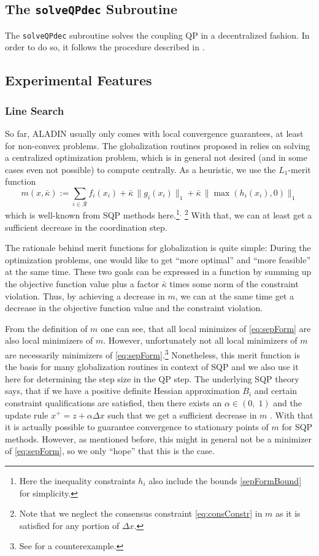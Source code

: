 \documentclass[]{scrartcl}
\begin{document}
\subsection{The \texttt{solveQPdec} Subroutine}
The \texttt{solveQPdec} subroutine solves the coupling QP in a decentralized fashion. 
In order to do so, it follows the procedure described in \cite{Engelmann19}.

\subsection{Experimental Features}
\subsubsection{Line Search}
So far, ALADIN usually only comes with local convergence guarantees, at least for non-convex problems. 
The globalization routines proposed in \cite{Houska} relies on solving a centralized optimization problem, which is in general not desired (and in some cases even not possible) to compute centrally.
As a heuristic, we use the $L_1$-merit function
\[
m(x,\bar \kappa) :=
\sum_{i \in \mathcal{R}} f_i(x_i) + \bar \kappa\, \|g_i(x_i)\|_1 + \bar \kappa\, \|\max(h_i(x_i),0)\|_1
\]
which is well-known from SQP methods here.\footnote{Here the inequality constraints $h_i$ also include the bounds \eqref{sepFormBound} for simplicity.}$^,$ \footnote{Note that we neglect the consensus constraint \eqref{eq:consConstr} in $m$ as it is satisfied for any portion of $\Delta x$.}
With that, we can at least get a sufficient decrease in the coordination step.

The rationale behind merit functions for globalization is quite simple: 
During the optimization problems, one would like to get ``more optimal'' and ``more feasible'' at the same time.
These two goals can be expressed in a function by summing up the objective function value plus a factor $\bar \kappa$ times some norm of the constraint violation.
Thus, by achieving a decrease in $m$, we can at the same time get a decrease in the objective function value and the constraint violation.

From the definition of $m$ one can see, that all local minimizes of \eqref{eq:sepForm} are also local minimizers of $m$. 
However, unfortunately not all local minimizers of $m$ are necessarily minimizers of \eqref{eq:sepForm}.\footnote{See \cite{Engelmann} for a counterexample.}
Nonetheless, this merit function is the basis for many globalization routines in context of SQP and we also use it here for determining the step size in the QP step.
The underlying SQP theory says, that if we have a positive definite Hessian approximation $B_i$ and certain constraint qualifications are satisfied, then there exists an $\alpha \in (0,\;1)$ and the update rule $x^+=z + \alpha \Delta x$ such that we get a sufficient decrease in $m$ \cite{Nocedal}.
With that it is actually possible to guarantee convergence to stationary points of $m$ for SQP methods.
However, as mentioned before, this might in general not be a minimizer of \eqref{eq:sepForm}, so we only ``hope'' that this is the case.
\end{document}
